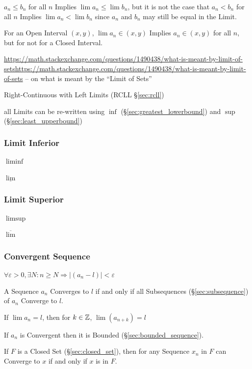 $a_n \leq b_n$ for all $n$ Implies $\lim a_n \leq \lim b_n$, but it is
not the case that $a_n < b_n$ for all $n$ Implies $\lim a_n < \lim
b_n$ since $a_n$ and $b_n$ may still be equal in the Limit.

For an Open Interval $(x,y)$, $\lim a_n \in (x,y)$ Implies $a_n \in
(x,y)$ for all $n$, but for not for a Closed Interval.

\url{https://math.stackexchange.com/questions/1490438/what-is-meant-by-limit-of-setshttps://math.stackexchange.com/questions/1490438/what-is-meant-by-limit-of-sets}
-- on what is meant by the ``Limit of Sets''

\fist Right-Continuous with Left Limits (RCLL \S\ref{sec:rcll})

all Limits can be re-written using $\inf$ (\S\ref{sec:greatest_lowerbound}) and
$\sup$ (\S\ref{sec:least_upperbound})



\subsubsection{Limit Inferior}\label{sec:liminf}

$\liminf$

$\underline{\lim}$



\subsubsection{Limit Superior}\label{sec:limsup}

$\limsup$

$\overline{\lim}$



\subsubsection{Convergent Sequence}\label{sec:convergent_sequence}

$\forall \varepsilon > 0, \exists N : n \geq N \Rightarrow |(a_n - l)| <
\varepsilon$

A Sequence $a_n$ Converges to $l$ if and only if all Subsequences
(\S\ref{sec:subsequence}) of $a_n$ Converge to $l$.

If $\lim a_n = l$, then for $k \in \mathbb{Z}$, $\lim (a_{n+k}) = l$

If $a_n$ is Convergent then it is Bounded
(\S\ref{sec:bounded_sequence}).

If $F$ is a Closed Set (\S\ref{sec:closed_set}), then for any Sequence
$x_n$ in $F$ can Converge to $x$ if and only if $x$ is in $F$.

